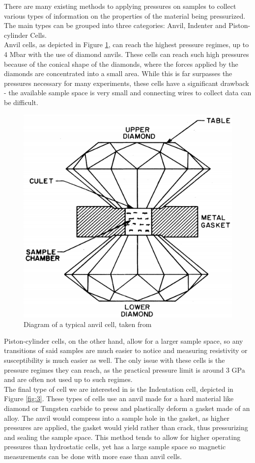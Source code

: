 \documentclass[11pt,onecolumn]{article}
\begin{document}
There are many existing methods to applying pressures on samples to collect various types of information on the properties of the material being pressurized. The main types can be grouped into three categories: Anvil, Indenter and Piston-cylinder Cells.\cite{expmethods}\\

Anvil cells, as depicted in Figure \ref{fig:1}, can reach the highest pressure regimes, up to 4 Mbar with the use of diamond anvils.\cite{highestpressure} These cells can reach such high pressures because of the conical shape of the diamonds, where the forces applied by the diamonds are concentrated into a small area. While this is far surpasses the pressures necessary for many experiments, these cells have a significant drawback - the available sample space is very small and connecting wires to collect data can be difficult.

\begin{figure}[ht]
	\centering
	\includegraphics[width=.5\columnwidth]{figures/DAC.png}
	\caption{Diagram of a typical anvil cell, taken from \cite{DAC}}
	\label{fig:1}
\end{figure}

Piston-cylinder cells, on the other hand, allow for a larger sample space, so any transitions of said samples are much easier to notice and measuring resistivity or susceptibility is much easier as well. The only issue with these cells is the pressure regimes they can reach, as the practical pressure limit is around 3 GPa and are often not used up to such regimes.\cite{expmethods}\\

The final type of cell we are interested in is the Indentation cell, depicted in Figure \ref{fig:3}. These types of cells use an anvil made for a hard material like diamond or Tungsten carbide to press and plastically deform a gasket made of an alloy. The anvil would compress into a sample hole in the gasket, as higher pressures are applied, the gasket would yield rather than crack, thus pressurizing and sealing the sample space. This method tends to allow for higher operating pressures than hydrostatic cells, yet has a large sample space so magnetic measurements can be done with more ease than anvil cells.\cite{IndenterCell}
\end{document}
